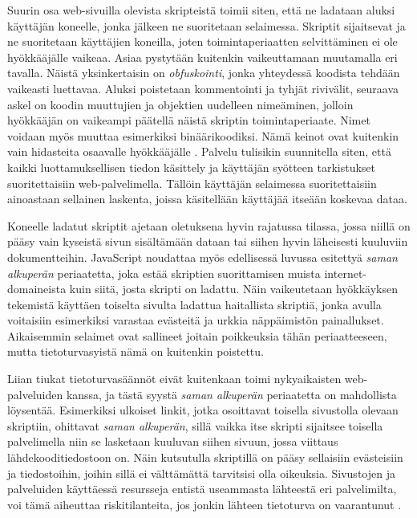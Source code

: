 Suurin osa web-sivuilla olevista skripteistä toimii siten, että ne ladataan aluksi käyttäjän koneelle, jonka jälkeen ne suoritetaan selaimessa. Skriptit sijaitsevat ja ne suoritetaan 
käyttäjien koneilla, joten toimintaperiaatten selvittäminen ei ole hyökkääjälle vaikeaa. Asiaa pystytään kuitenkin vaikeuttamaan muutamalla eri tavalla. Näistä yksinkertaisin on 
\emph{obfuskointi}, jonka yhteydessä koodista tehdään vaikeasti luettavaa. Aluksi poistetaan kommentointi ja tyhjät rivivälit, seuraava askel on koodin muuttujien ja objektien
uudelleen nimeäminen, jolloin hyökkääjän on vaikeampi päätellä näistä skriptin toimintaperiaate. Nimet voidaan myös muuttaa esimerkiksi binäärikoodiksi. Nämä keinot ovat kuitenkin 
vain hidasteita osaavalle hyökkääjälle \cite{AJAX}. Palvelu tulisikin suunnitella siten, että kaikki luottamuksellisen tiedon käsittely ja käyttäjän syötteen tarkistukset suoritettaisiin
web-palvelimella. Tällöin käyttäjän selaimessa suoritettaisiin ainoastaan sellainen laskenta, joissa käsitellään käyttäjää itseään koskevaa dataa.

Koneelle ladatut skriptit ajetaan oletuksena hyvin rajatussa tilassa, jossa niillä on pääsy vain kyseistä sivun sisältämään dataan tai siihen hyvin läheisesti kuuluviin dokumentteihin. 
JavaScript noudattaa myös  edellisessä luvussa esitettyä \emph{saman alkuperän} periaatetta, joka estää skriptien suorittamisen muista internet-domaineista kuin siitä, josta skripti on
ladattu. Näin vaikeutetaan hyökkäyksen tekemistä käyttäen toiselta sivulta ladattua haitallista skriptiä, jonka avulla voitaisiin esimerkiksi varastaa evästeitä ja urkkia näppäimistön
painallukset.  Aikaisemmin selaimet ovat sallineet joitain poikkeuksia tähän periaatteeseen, mutta tietoturvasyistä nämä on kuitenkin poistettu.

Liian tiukat tietoturvasäännöt eivät 
kuitenkaan toimi nykyaikaisten web-pal\-ve\-lui\-den kanssa, ja tästä syystä \emph{saman alkuperän} periaatetta on mahdollista löysentää. Esimerkiksi ulkoiset linkit, jotka osoittavat toisella
sivustolla olevaan skriptiin, ohittavat \emph{saman alkuperän}, sillä vaikka itse skripti sijaitsee toisella palvelimella niin se lasketaan kuuluvan siihen sivuun, jossa viittaus
lähdekooditiedostoon on.  Näin kutsutulla skriptillä on pääsy sellaisiin evästeisiin ja tiedostoihin, joihin sillä ei välttämättä tarvitsisi olla oikeuksia. Sivustojen ja palveluiden 
käyttäessä resursseja entistä useammasta lähteestä eri palvelimilta, voi tämä aiheuttaa riskitilanteita, jos jonkin lähteen tietoturva on vaarantunut \cite{AJAX}.

